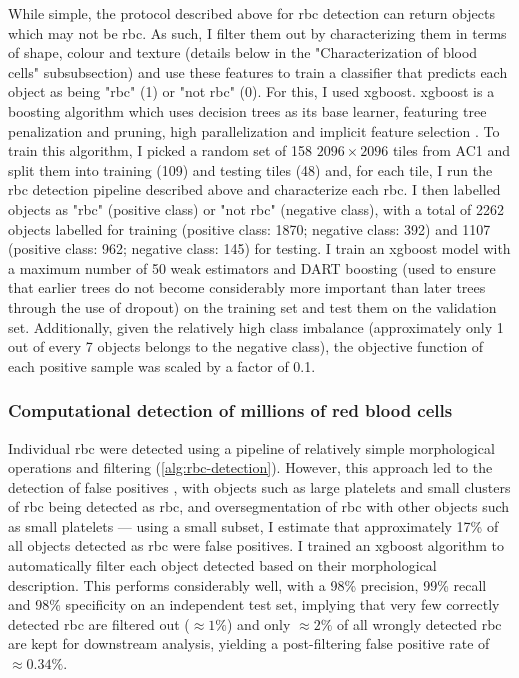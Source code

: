 While simple, the protocol described above for \ac{rbc} detection can return objects which may not be \ac{rbc}. As such, I filter them out by characterizing them in terms of shape, colour and texture (details below in the "Characterization of blood cells" subsubsection) and use these features to train a classifier that predicts each object as being "\ac{rbc}" (1) or "not \ac{rbc}" (0). For this, I used \ac{xgboost}. \ac{xgboost} is a boosting algorithm which uses decision trees as its base learner, featuring tree penalization and pruning, high parallelization and implicit feature selection \cite{Chen2016-xk}. To train this algorithm, I picked a random set of 158 $2096 \times 2096$ tiles from AC1 and split them into training (109) and testing tiles (48) and, for each tile, I run the \ac{rbc} detection pipeline described above and characterize each \ac{rbc}. I then labelled objects as "\ac{rbc}" (positive class) or "not \ac{rbc}" (negative class), with a total of 2262 objects labelled for training (positive class: 1870; negative class: 392) and 1107 (positive class: 962; negative class: 145) for testing. I train an \ac{xgboost} model with a maximum number of 50 weak estimators and DART boosting (used to ensure that earlier trees do not become considerably more important than later trees through the use of dropout) \cite{Rashmi2015-qe} on the training set and test them on the validation set. Additionally, given the relatively high class imbalance (approximately only 1 out of every 7 objects belongs to the negative class), the objective function of each positive sample was scaled by a factor of 0.1.

\subsubsection{Computational detection of millions of red blood cells}

Individual \ac{rbc} were detected using a pipeline of relatively simple morphological operations and filtering (\ref{alg:rbc-detection}). However, this approach led to the detection of false positives , with objects such as large platelets and small clusters of \ac{rbc} being detected as \ac{rbc}, and oversegmentation of \ac{rbc} with other objects such as small platelets --- using a small subset, I estimate that approximately 17\% of all objects detected as \ac{rbc} were false positives. I trained an \ac{xgboost} algorithm to automatically filter each object detected based on their morphological description. This performs considerably well, with a 98\% precision, 99\% recall and 98\% specificity on an independent test set, implying that very few correctly detected \ac{rbc} are filtered out ($\approx 1\%$) and only $\approx 2\%$ of all wrongly detected \ac{rbc} are kept for downstream analysis, yielding a post-filtering false positive rate of $\approx 0.34\%$. 

